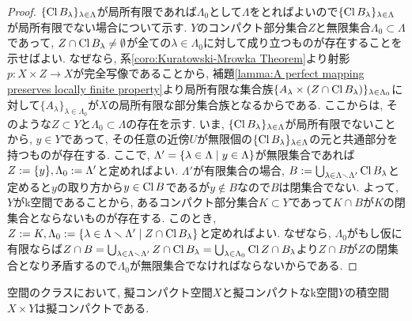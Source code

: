 \documentclass[uplatex, dvipdfmx, a4paper, 12pt, class=jsbook, crop=false]{standalone}
\begin{document}
\begin{proof}
	$ \{\mathop{\mathrm{Cl}}\nolimits B_\lambda\}_{\lambda \in \Lambda} $が局所有限であれば$ \Lambda_0 $として$ \Lambda $をとればよいので$ \{\mathop{\mathrm{Cl}}\nolimits B_\lambda\}_{\lambda \in \Lambda} $が局所有限でない場合について示す. $ Y $のコンパクト部分集合$ Z $と無限集合$ \Lambda_0 \subset \Lambda $であって, $ Z \cap \mathop{\mathrm{Cl}}\nolimits B_{\lambda} \neq \emptyset $が全ての$ \lambda \in \Lambda_0 $に対して成り立つものが存在することを示せばよい. なぜなら, 系\ref{coro:Kuratowski-Mrowka Theorem}より射影$ p \colon X \times Z \to X $が完全写像であることから, 補題\ref{lamma:A perfect mapping preserves locally finite property}より局所有限な集合族$ \{A_\lambda \times (Z \cap \mathop{\mathrm{Cl}}\nolimits B_\lambda)\}_{\lambda \in \Lambda_0} $に対して$ \{A_\lambda\}_{\lambda \in \Lambda_0} $が$ X $の局所有限な部分集合族となるからである. ここからは, そのような$ Z \subset Y $と$ \Lambda_0 \subset \Lambda $の存在を示す. いま, $ \{\mathop{\mathrm{Cl}}\nolimits B_\lambda\}_{\lambda \in \Lambda} $が局所有限でないことから, $ y \in Y $であって, その任意の近傍$ U $が無限個の$ \{\mathop{\mathrm{Cl}}\nolimits B_\lambda\}_{\lambda \in \Lambda} $の元と共通部分を持つものが存在する. ここで, $ \Lambda' = \setcomp{\lambda \in \Lambda}{y \in \Lambda} $が無限集合であれば$ Z \mathrel{:=} \{y\}, \Lambda_0 \mathrel{:=} \Lambda' $と定めればよい. $ \Lambda' $が有限集合の場合, $ B \mathrel{:=} \bigcup_{\lambda \in \Lambda \smallsetminus \Lambda'} \mathop{\mathrm{Cl}}\nolimits B_\lambda $と定めると$ y $の取り方から$ y \in \mathop{\mathrm{Cl}}\nolimits B $であるが$ y \notin B $なので$ B $は閉集合でない. よって, $ Y $がk空間であることから, あるコンパクト部分集合$ K \subset Y $であって$ K \cap B $が$ K $の閉集合とならないものが存在する. このとき, $ Z \defeq K, \Lambda_0 \defeq \setcomp{\lambda \in \Lambda \setminus \Lambda'}{Z \cap \topcl B_\lambda} $と定めればよい. なぜなら, $ \Lambda_0 $がもし仮に有限ならば$ Z \cap B = \bigcup_{\lambda \in \Lambda \smallsetminus \Lambda'} Z \cap \mathop{\mathrm{Cl}}\nolimits B_\lambda = \bigcup_{\lambda \in \Lambda_0} \mathop{\mathrm{Cl}}\nolimits Z \cap B_\lambda $より$ Z \cap B $が$ Z $の閉集合となり矛盾するので$ \Lambda_0 $が無限集合でなければならないからである.
\end{proof}

\begin{proposition}
	空間のクラスにおいて, 擬コンパクト空間$ X $と擬コンパクトなk空間$ Y $の積空間$ X \times Y $は擬コンパクトである.
\end{proposition}
\end{document}
